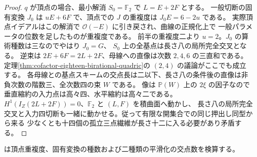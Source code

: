 \begin{proof}
$q$ が頂点の場合、最小解消 $S_0=\mathbb F_2$ で $L=E+2F$ とする。
一般切断の固有変換 $J_0$ は $uE+6F$ で、頂点での $J$ の重複度は $J_0E=6-2u$ である。
実際頂点イデアルはこの解消で $\mathcal O(-E)$ に引き戻され、曲線の正規化上で
一般パラメータの位数を足したものが重複度である。
前半の重複度二より $u=2$。$J_0$ の算術種数は三なのでやはり $J_0=G$、
$S_0$ 上の全基点は長さ八の局所完全交叉となる。
逆束は $2E+6F=2L+2F$、母線への直像は次数 $2,4,6$ の三直和である。
定理\ref{thm:cofactor-eighteen-birational-quadric}の $(2,4)$ の議論がここでも成立する。
各母線との基点スキームの交点長は二以下、長さ八の条件後の直像は非負次数の階数三、全次数四の束 $W$ である。
像は $\mathbb P(W)$ 上の $2\xi$ の因子なので垂直縮約の入力点は高々四、水平縮約は高々二である。
$H^1(I_Z(2L+2F))=0$、$\mathbb F_2$ と $(L,F)$ を積曲面へ動かし、
長さ八の局所完全交叉と入力四切断も一緒に動かせる。従って有限な開集合での同じ押出し同型から来る
少なくとも十四個の孤立三点繊維が長さ十二に入る必要があり矛盾する。
\end{proof}
 は頂点重複度、固有変換の種数および二種類の平滑化の交点数を検算する。
